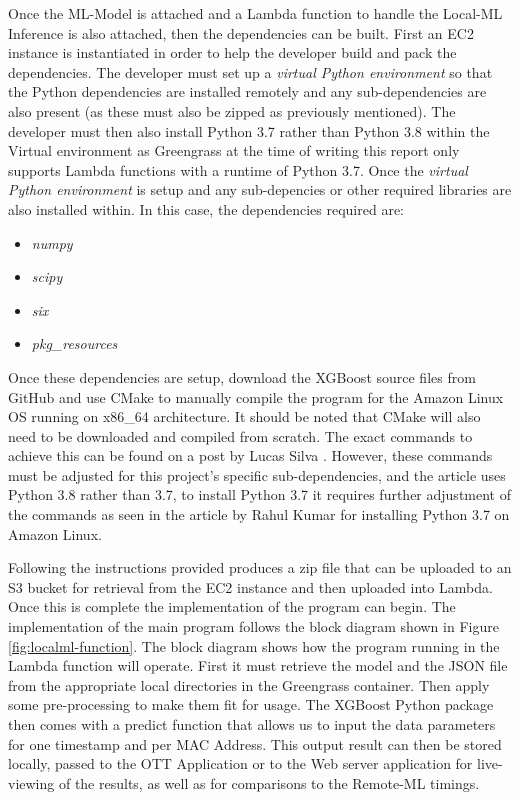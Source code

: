 Once the ML-Model is attached and a Lambda function to handle the Local-ML Inference is also attached, then the dependencies can be built. First an EC2 instance is instantiated in order to help the developer build and pack the dependencies. The developer must set up a \textit{virtual Python environment} so that the Python dependencies are installed remotely and any sub-dependencies are also present (as these must also be zipped as previously mentioned). The developer must then also install Python 3.7 rather than Python 3.8 within the Virtual environment as Greengrass at the time of writing this report only supports Lambda functions with a runtime of Python 3.7. Once the \textit{virtual Python environment} is setup and any sub-depencies or other required libraries are also installed within. In this case, the dependencies required are:
\begin{itemize}
    \item \textit{numpy}
    \item \textit{scipy}
    \item \textit{six}
    \item \textit{pkg\_resources}
\end{itemize}
Once these dependencies are setup, download the XGBoost source files from GitHub and use CMake to manually compile the program for the Amazon Linux OS running on x86\_64 architecture. It should be noted that CMake will also need to be downloaded and compiled from scratch. The exact commands to achieve this can be found on a post by Lucas Silva \cite{silva_2019}. However, these commands must be adjusted for this project's specific sub-dependencies, and the article uses Python 3.8 rather than 3.7, to install Python 3.7 it requires further adjustment of the commands as seen in the article by Rahul Kumar for installing Python 3.7 on Amazon Linux. \cite{kumar_2020} 

Following the instructions provided produces a zip file that can be uploaded to an S3 bucket for retrieval from the EC2 instance and then uploaded into Lambda. Once this is complete the implementation of the program can begin. The implementation of the main program follows the block diagram shown in Figure \ref{fig:localml-function}. The block diagram shows how the program running in the Lambda function will operate. First it must retrieve the model and the JSON file from the appropriate local directories in the Greengrass container. Then apply some pre-processing to make them fit for usage. The XGBoost Python package then comes with a predict function that allows us to input the data parameters for one timestamp and per MAC Address. This output result can then be stored locally, passed to the OTT Application or to the Web server application for live-viewing of the results, as well as for comparisons to the Remote-ML timings.

